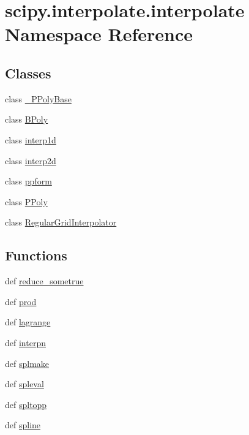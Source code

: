 \hypertarget{namespacescipy_1_1interpolate_1_1interpolate}{}\section{scipy.\+interpolate.\+interpolate Namespace Reference}
\label{namespacescipy_1_1interpolate_1_1interpolate}
\subsection*{Classes}
\begin{DoxyCompactItemize}
\item 
class \hyperlink{classscipy_1_1interpolate_1_1interpolate_1_1__PPolyBase}{\+\_\+\+P\+Poly\+Base}
\item 
class \hyperlink{classscipy_1_1interpolate_1_1interpolate_1_1BPoly}{B\+Poly}
\item 
class \hyperlink{classscipy_1_1interpolate_1_1interpolate_1_1interp1d}{interp1d}
\item 
class \hyperlink{classscipy_1_1interpolate_1_1interpolate_1_1interp2d}{interp2d}
\item 
class \hyperlink{classscipy_1_1interpolate_1_1interpolate_1_1ppform}{ppform}
\item 
class \hyperlink{classscipy_1_1interpolate_1_1interpolate_1_1PPoly}{P\+Poly}
\item 
class \hyperlink{classscipy_1_1interpolate_1_1interpolate_1_1RegularGridInterpolator}{Regular\+Grid\+Interpolator}
\end{DoxyCompactItemize}
\subsection*{Functions}
\begin{DoxyCompactItemize}
\item 
def \hyperlink{namespacescipy_1_1interpolate_1_1interpolate_a57b8ac4bb52718947ce6c1d22ce149ad}{reduce\+\_\+sometrue}
\item 
def \hyperlink{namespacescipy_1_1interpolate_1_1interpolate_a38a66c32900b82fab6ead6f69e2d6ec4}{prod}
\item 
def \hyperlink{namespacescipy_1_1interpolate_1_1interpolate_afb60565492d9ff6b51deb4ba9db1fd77}{lagrange}
\item 
def \hyperlink{namespacescipy_1_1interpolate_1_1interpolate_ae6ebd1c2cdc35a4a9fa4982e87627859}{interpn}
\item 
def \hyperlink{namespacescipy_1_1interpolate_1_1interpolate_acf507d22fb6f9eb2a2bbad97eda97afd}{splmake}
\item 
def \hyperlink{namespacescipy_1_1interpolate_1_1interpolate_a30cabdf54a37da7252a8fa0264d435e5}{spleval}
\item 
def \hyperlink{namespacescipy_1_1interpolate_1_1interpolate_ad8c7212e6ef94cb8978bf1573fc35cff}{spltopp}
\item 
def \hyperlink{namespacescipy_1_1interpolate_1_1interpolate_a1579df94f4f5c45ae161c7559ae80fa6}{spline}
\end{DoxyCompactItemize}
